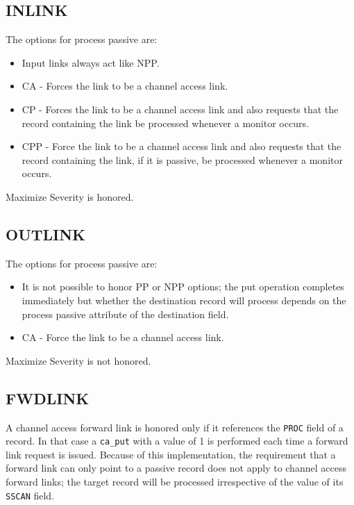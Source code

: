 \subsection{INLINK}

The options for process passive are:

\begin{itemize}
\item Input links always act like NPP.

\item CA - Forces the link to be a channel access link.

\item CP - Forces the link to be a channel access link and also requests that the record containing the link be processed whenever a monitor occurs.

\item CPP - Force the link to be a channel access link and also requests that the record containing the link, if it is passive, be processed whenever a monitor occurs.

\end{itemize}

Maximize Severity is honored.

\subsection{OUTLINK}

The options for process passive are:

\begin{itemize}
\item It is not possible to honor PP or NPP options; the put operation completes immediately but whether the destination record will process depends on the process passive attribute of the destination field.

\item CA - Force the link to be a channel access link.

\end{itemize}

Maximize Severity is not honored.

\subsection{FWDLINK}

A channel access forward link is honored only if it references the \verb|PROC| field of a record.
In that case a \verb|ca_put| with a value of 1 is performed each time a forward link request is issued.
Because of this implementation, the requirement that a forward link can only point to a passive record does not apply to channel access forward links;
the target record will be processed irrespective of the value of its \verb|SSCAN| field.

